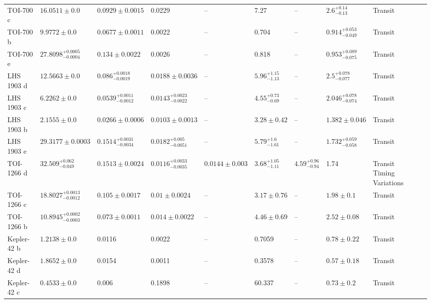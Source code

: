 \begin{tabular}{llllllllll}
TOI-700 c & $16.0511 \pm 0.0$ & $0.0929 \pm 0.0015$ & 0.0229 & -- & 7.27 & -- & $2.6^{+0.14}_{-0.13}$ & Transit & \cite{GILBERT_ET_AL_2023} \\
TOI-700 b & $9.9772 \pm 0.0$ & $0.0677 \pm 0.0011$ & 0.0022 & -- & 0.704 & -- & $0.914^{+0.053}_{-0.049}$ & Transit & \cite{GILBERT_ET_AL_2023} \\
TOI-700 e & $27.8098^{+0.0005}_{-0.0004}$ & $0.134 \pm 0.0022$ & 0.0026 & -- & 0.818 & -- & $0.953^{+0.089}_{-0.075}$ & Transit & \cite{GILBERT_ET_AL_2023} \\
LHS 1903 d & $12.5663 \pm 0.0$ & $0.086^{+0.0018}_{-0.0019}$ & $0.0188 \pm 0.0036$ & -- & $5.96^{+1.15}_{-1.13}$ & -- & $2.5^{+0.078}_{-0.077}$ & Transit & \cite{WILSON_ET_AL_2026} \\
LHS 1903 c & $6.2262 \pm 0.0$ & $0.0539^{+0.0011}_{-0.0012}$ & $0.0143^{+0.0023}_{-0.0022}$ & -- & $4.55^{+0.73}_{-0.69}$ & -- & $2.046^{+0.078}_{-0.074}$ & Transit & \cite{WILSON_ET_AL_2026} \\
LHS 1903 b & $2.1555 \pm 0.0$ & $0.0266 \pm 0.0006$ & $0.0103 \pm 0.0013$ & -- & $3.28 \pm 0.42$ & -- & $1.382 \pm 0.046$ & Transit & \cite{WILSON_ET_AL_2026} \\
LHS 1903 e & $29.3177 \pm 0.0003$ & $0.1514^{+0.0031}_{-0.0034}$ & $0.0182^{+0.005}_{-0.0051}$ & -- & $5.79^{+1.6}_{-1.61}$ & -- & $1.732^{+0.059}_{-0.058}$ & Transit & \cite{WILSON_ET_AL_2026} \\
TOI-1266 d & $32.509^{+0.062}_{-0.049}$ & $0.1513 \pm 0.0024$ & $0.0116^{+0.0033}_{-0.0035}$ & $0.0144 \pm 0.003$ & $3.68^{+1.05}_{-1.11}$ & $4.59^{+0.96}_{-0.94}$ & 1.74 & Transit Timing Variations & \cite{GREKLEK_MCKEON_ET_AL_2025} \\
TOI-1266 c & $18.8027^{+0.0013}_{-0.0012}$ & $0.105 \pm 0.0017$ & $0.01 \pm 0.0024$ & -- & $3.17 \pm 0.76$ & -- & $1.98 \pm 0.1$ & Transit & \cite{GREKLEK_MCKEON_ET_AL_2025} \\
TOI-1266 b & $10.8945^{+0.0002}_{-0.0003}$ & $0.073 \pm 0.0011$ & $0.014 \pm 0.0022$ & -- & $4.46 \pm 0.69$ & -- & $2.52 \pm 0.08$ & Transit & \cite{GREKLEK_MCKEON_ET_AL_2025} \\
Kepler-42 b & $1.2138 \pm 0.0$ & 0.0116 & 0.0022 & -- & 0.7059 & -- & $0.78 \pm 0.22$ & Transit & \cite{MUIRHEAD_ET_AL__2012} \\
Kepler-42 d & $1.8652 \pm 0.0$ & 0.0154 & 0.0011 & -- & 0.3578 & -- & $0.57 \pm 0.18$ & Transit & \cite{MUIRHEAD_ET_AL__2012} \\
Kepler-42 c & $0.4533 \pm 0.0$ & 0.006 & 0.1898 & -- & 60.337 & -- & $0.73 \pm 0.2$ & Transit & \cite{MUIRHEAD_ET_AL__2012} \\

\end{tabular}
